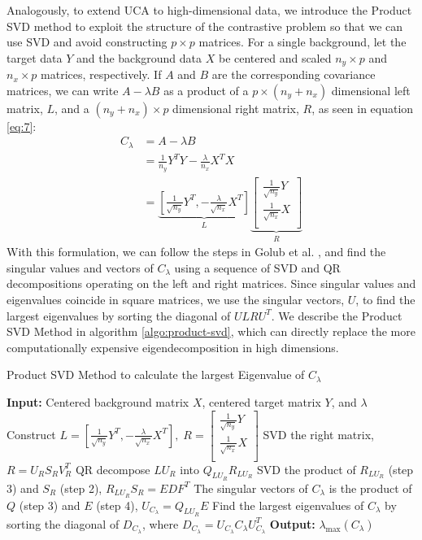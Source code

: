 \documentclass[12pt]{article}
\begin{document}
Analogously, to extend UCA to high-dimensional data, we introduce the Product SVD method to exploit the structure of the contrastive problem so that we can use SVD and avoid constructing $p \times p$ matrices. For a single background, let the target data $Y$ and the background data $X$ be centered and scaled $n_y \times p$ and $n_x \times p$ matrices, respectively. If $A$ and $B$ are the corresponding covariance matrices, we can write $A - \lambda B$ as a product of a $p \times (n_y + n_x)$ dimensional left matrix, $L$, and a $(n_y + n_x) \times p$ dimensional right matrix, $R$, as seen in equation \ref{eq:7}:
\begin{align}
  C_\lambda &= A - \lambda B \nonumber\\
            &=\frac{1}{n_y}Y^TY -\frac{\lambda}{n_x} X^T X\nonumber \\
            &=  \underbrace{\left[ \frac{1}{\sqrt{n_{y}}}Y^T, - \frac{\lambda}{\sqrt{n_{x}}} X^T\right]}_{L}\underbrace{\begin{bmatrix*} \frac{1}{\sqrt{n_{y}}}Y \\ \frac{1}{\sqrt{n_{x}}}X \\ \end{bmatrix*}}_{R} \label{eq:7}
\end{align}
With this formulation, we can follow the steps in Golub et al.  \cite{Golub}, and find the singular values and vectors of $C_\lambda$ using a sequence of SVD and QR decompositions operating on the left and right matrices. Since singular values and eigenvalues coincide in square matrices, we use the singular vectors, $U$, to find the largest eigenvalues by sorting the diagonal of $ULRU^T$.  
We describe the Product SVD Method in algorithm \ref{algo:product-svd}, which can directly replace the more computationally expensive eigendecomposition in high dimensions.

\begin{algorithm}[ht]
  \caption{Product SVD Method to calculate the largest Eigenvalue of $C_\lambda$}
  \label{algo:product-svd}
  \SetAlgoLined
  \textbf{Input:} Centered background matrix $X$, centered target matrix $Y$, and $\lambda$\;
  \nl Construct 
  $  L = \left[ \frac{1}{\sqrt{n_{y}}}Y^T, - \frac{\lambda}{\sqrt{n_{x}}} X^T\right],\;
  R = \begin{bmatrix*} \frac{1}{\sqrt{n_{y}}}Y \\ \frac{1}{\sqrt{n_{x}}}X \\ \end{bmatrix*} $\;
  \nl  SVD the right matrix, $R = U_R S_R V^T_R$ \;
  \nl  QR decompose $LU_R$ into  $Q_{LU_R}R_{LU_R}$ \;
  \nl  SVD the product of $R_{LU_R}$ (step 3) and $S_R$ (step 2), $R_{LU_R}S_{R} = EDF^T$ \;
  \nl  The singular vectors of $C_\lambda$ is the product of $Q$ (step 3) and $E$ (step 4), $U_{C_\lambda} = Q_{LU_R}E$ \;
  \nl  Find the largest eigenvalues of $C_\lambda$ by sorting the diagonal of $D_{C_\lambda}$, where $D_{C_\lambda} = U_{C_\lambda} C_\lambda U_{C_\lambda}^T$ \;
  \textbf{Output:} $\lambda_{\text{max}}\left( C_\lambda \right)$ 
\end{algorithm}
\end{document}
